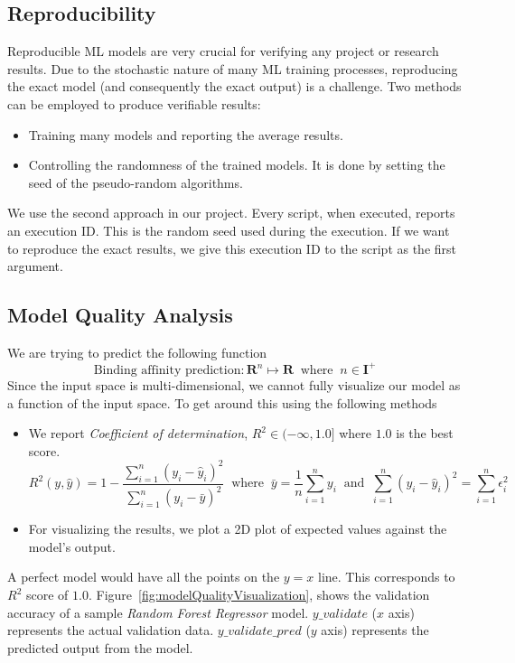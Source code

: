 \documentclass[11pt]{article}
\begin{document}
\subsection{Reproducibility}
Reproducible ML models are very crucial for verifying any project or research results. Due to the stochastic nature of many ML training processes, reproducing the exact model (and consequently the exact output) is a challenge. Two methods can be employed to produce verifiable results:
\begin{itemize}
\item Training many models and reporting the average results.
\item Controlling the randomness of the trained models. It is done by setting the seed of the pseudo-random algorithms.
\end{itemize}

We use the second approach in our project. Every script, when executed, reports an execution ID. This is the random seed used during the execution. If we want to reproduce the exact results, we give this execution ID to the script as the first argument.

\subsection{Model Quality Analysis}
We are trying to predict the following function
$$ \textrm{Binding affinity prediction} : \mathbf{R}^n \mapsto \mathbf{R} \;\; \textrm{where} \;\; n \in \mathbf{I}^+$$
Since the input space is multi-dimensional, we cannot fully visualize our model as a function of the input space.
To get around this using the following methods
\begin{itemize}
\item We report \textit{Coefficient of determination}, $R^2  \in (- \infty, 1.0]$ where $1.0$ is the best score. \cite{r_squared_score}
$$R^2(y, \hat{y}) = 1 - \frac{\sum_{i=1}^{n} (y_i - \hat{y}_i)^2}{\sum_{i=1}^{n} (y_i - \bar{y})^2} \;\; \textrm{where} \;\; \bar{y} = \frac{1}{n} \sum_{i=1}^{n} y_i \;\;
\textrm{and} \;\; \sum_{i=1}^{n} (y_i - \hat{y}_i)^2 = \sum_{i=1}^{n} \epsilon_i^2$$

\item For visualizing the results,  we plot a 2D plot of expected values against the model's output. 
\end{itemize}

A perfect model would have all the points on the $y = x$ line.  This corresponds to $R^2$ score of $1.0$. 
Figure~\ref{fig:modelQualityVisualization},  shows the validation accuracy of a sample \textit{Random Forest Regressor} model.
$y\_validate$ ($x$ axis) represents the actual validation data.
$y\_validate\_pred$ ($y$ axis) represents the predicted output from the model.
\end{document}
